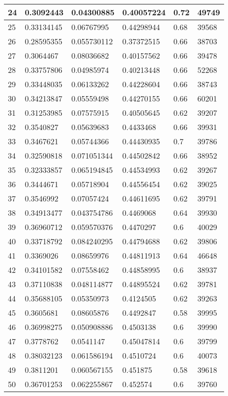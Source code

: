 \begin{longtable}{|l|l|l|l|l|l|}
24 & 0.3092443 & 0.04300885 & 0.40057224 & 0.72 & 49749 \\ \hline 
25 & 0.33134145 & 0.06767995 & 0.44298944 & 0.68 & 39568 \\ \hline 
26 & 0.28595355 & 0.055730112 & 0.37372515 & 0.66 & 38703 \\ \hline 
27 & 0.3064467 & 0.08036682 & 0.40157562 & 0.66 & 39478 \\ \hline 
28 & 0.33757806 & 0.04985974 & 0.40213448 & 0.66 & 52268 \\ \hline 
29 & 0.33448035 & 0.06133262 & 0.44228604 & 0.66 & 38743 \\ \hline 
30 & 0.34213847 & 0.05559498 & 0.44270155 & 0.66 & 60201 \\ \hline 
31 & 0.31253985 & 0.07575915 & 0.40505645 & 0.62 & 39207 \\ \hline 
32 & 0.3540827 & 0.05639683 & 0.4433468 & 0.66 & 39931 \\ \hline 
33 & 0.3467621 & 0.05744366 & 0.44430935 & 0.7 & 39786 \\ \hline 
34 & 0.32590818 & 0.071051344 & 0.44502842 & 0.66 & 38952 \\ \hline 
35 & 0.32333857 & 0.065194845 & 0.44534993 & 0.62 & 39267 \\ \hline 
36 & 0.3444671 & 0.05718904 & 0.44556454 & 0.62 & 39025 \\ \hline 
37 & 0.3546992 & 0.07057424 & 0.44611695 & 0.62 & 39791 \\ \hline 
38 & 0.34913477 & 0.043754786 & 0.4469068 & 0.64 & 39930 \\ \hline 
39 & 0.36960712 & 0.059570376 & 0.4470297 & 0.6 & 40029 \\ \hline 
40 & 0.33718792 & 0.084240295 & 0.44794688 & 0.62 & 39806 \\ \hline 
41 & 0.3369026 & 0.08659976 & 0.44811913 & 0.64 & 46648 \\ \hline 
42 & 0.34101582 & 0.07558462 & 0.44858995 & 0.6 & 38937 \\ \hline 
43 & 0.37110838 & 0.048114877 & 0.44895524 & 0.62 & 39781 \\ \hline 
44 & 0.35688105 & 0.05350973 & 0.4124505 & 0.62 & 39263 \\ \hline 
45 & 0.3605681 & 0.08605876 & 0.4492847 & 0.58 & 39995 \\ \hline 
46 & 0.36998275 & 0.050908886 & 0.4503138 & 0.6 & 39990 \\ \hline 
47 & 0.3778762 & 0.0541147 & 0.45047814 & 0.6 & 39799 \\ \hline 
48 & 0.38032123 & 0.061586194 & 0.4510724 & 0.6 & 40073 \\ \hline 
49 & 0.3811201 & 0.060567155 & 0.451875 & 0.58 & 39618 \\ \hline 
50 & 0.36701253 & 0.062255867 & 0.452574 & 0.6 & 39760 \\ \hline 
\end{longtable}